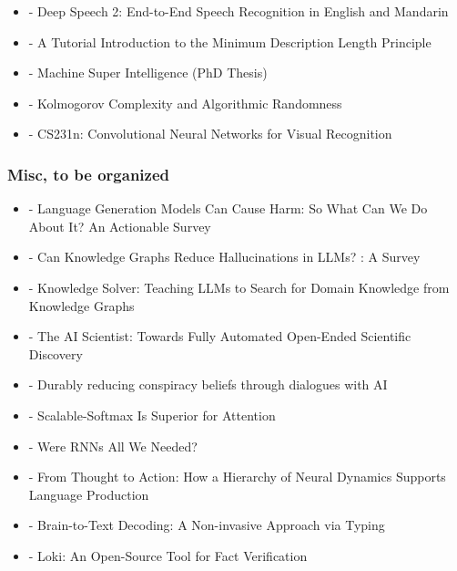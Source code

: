\documentclass[
  letterpaper,
  DIV=11,
  numbers=noendperiod]{scrartcl}
\providecommand{\tightlist}{%
  \setlength{\itemsep}{0pt}\setlength{\parskip}{0pt}}
\begin{document}
\begin{itemize}
\item
  \autocite{amodei2016deep} - Deep Speech 2: End-to-End Speech
  Recognition in English and Mandarin
\item
  \autocite{grunwald2004tutorial} - A Tutorial Introduction to the
  Minimum Description Length Principle
\item
  \autocite{legg2008machine} - Machine Super Intelligence (PhD Thesis)
\item
  \autocite{shen2017kolmogorov} - Kolmogorov Complexity and Algorithmic
  Randomness
\item
  \autocite{feifei2016cs231n} - CS231n: Convolutional Neural Networks
  for Visual Recognition
\end{itemize}

\subsubsection{Misc, to be organized}\label{misc-to-be-organized}

\begin{itemize}
\tightlist
\item
  \autocite{kumar-etal-2023-language} - Language Generation Models Can
  Cause Harm: So What Can We Do About It? An Actionable Survey
\item
  \autocite{agrawal2024knowledgegraphsreducehallucinations} - Can
  Knowledge Graphs Reduce Hallucinations in LLMs? : A Survey
\item
  \autocite{feng2023knowledgesolverteachingllms} - Knowledge Solver:
  Teaching LLMs to Search for Domain Knowledge from Knowledge Graphs
\item
  \autocite{lu2024aiscientistfullyautomated} - The AI Scientist: Towards
  Fully Automated Open-Ended Scientific Discovery
\item
  \autocite{doi:10.1126/science.adq1814} - Durably reducing conspiracy
  beliefs through dialogues with AI
\item
  \autocite{nakanishi2025scalablesoftmaxsuperiorattention} -
  Scalable-Softmax Is Superior for Attention
\item
  \autocite{feng2024rnnsneeded} - Were RNNs All We Needed?
\item
  \autocite{zhang2025thoughtactionhierarchyneural} - From Thought to
  Action: How a Hierarchy of Neural Dynamics Supports Language
  Production
\item
  \autocite{lévy2025braintotextdecodingnoninvasiveapproach} -
  Brain-to-Text Decoding: A Non-invasive Approach via Typing
\item
  \autocite{li-etal-2025-loki} - Loki: An Open-Source Tool for Fact
  Verification
\end{itemize}


\printbibliography
\end{document}
